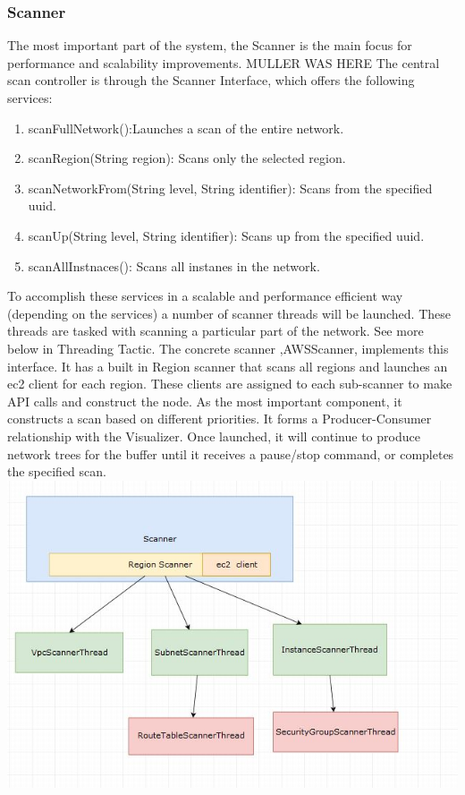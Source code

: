 \documentclass[hidelinks,a4paper,12pt]{article}
\begin{document}
\subsubsection{Scanner}
The most important part of the system, the Scanner is the main focus for performance and scalability improvements. MULLER WAS HERE The central scan controller is through the Scanner Interface, which offers the following services:
\begin{enumerate} 
\item scanFullNetwork():Launches a scan of the entire network.
\item scanRegion(String region): Scans only the selected region.
\item scanNetworkFrom(String level, String identifier): Scans from the specified uuid.
\item scanUp(String level, String identifier): Scans up from the specified uuid.
\item scanAllInstnaces(): Scans all instanes in the network.

\end{enumerate}

To accomplish these services in a scalable and performance efficient way (depending on the services) a number of scanner threads will be launched. These threads are tasked with scanning a particular part of the network. See more below in Threading Tactic.
\newline
The concrete scanner ,AWSScanner, implements this interface. It has a built in Region scanner that scans all regions and launches an ec2 client for each region. These clients are assigned to each sub-scanner to make API calls and construct the node.
\newline
As the most important component, it constructs a scan based on different priorities. It forms a Producer-Consumer relationship with the Visualizer. Once launched, it will continue to produce network trees for the buffer until it receives a pause/stop command, or completes the specified scan.
\newline
\includegraphics[width=1.00\textwidth]{./images/scanner.jpg}\\[0.4cm] 
\end{document}
